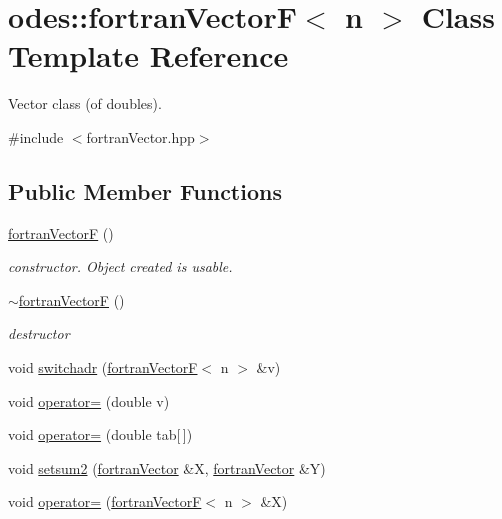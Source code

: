 \hypertarget{classodes_1_1fortranVectorF}{}\section{odes\+:\+:fortran\+Vector\+F$<$ n $>$ Class Template Reference}
\label{classodes_1_1fortranVectorF}


Vector class (of doubles).  




{\ttfamily \#include $<$fortran\+Vector.\+hpp$>$}

\subsection*{Public Member Functions}
\begin{DoxyCompactItemize}
\item 
\hyperlink{classodes_1_1fortranVectorF_a446528db3c1fe4b61dcfac9402b8c619}{fortran\+Vector\+F} ()
\begin{DoxyCompactList}\small\item\em constructor. Object created is usable. \end{DoxyCompactList}\item 
\hyperlink{classodes_1_1fortranVectorF_a668d0dbea090a6298c165092b27502ed}{$\sim$fortran\+Vector\+F} ()
\begin{DoxyCompactList}\small\item\em destructor \end{DoxyCompactList}\item 
void \hyperlink{classodes_1_1fortranVectorF_a88c726b6b22cdf20f81b345c89a51b95}{switchadr} (\hyperlink{classodes_1_1fortranVectorF}{fortran\+Vector\+F}$<$ n $>$ \&v)
\item 
void \hyperlink{classodes_1_1fortranVectorF_afeffa2b15976ed45e30a02af9afd1b58}{operator=} (double v)
\item 
void \hyperlink{classodes_1_1fortranVectorF_ae03bfc204b53e79814d762d43ee569fa}{operator=} (double tab\mbox{[}$\,$\mbox{]})
\item 
void \hyperlink{classodes_1_1fortranVectorF_a378e1167cdb871723f9a0ce254671a97}{setsum2} (\hyperlink{classodes_1_1fortranVector}{fortran\+Vector} \&X, \hyperlink{classodes_1_1fortranVector}{fortran\+Vector} \&Y)
\item 
void \hyperlink{classodes_1_1fortranVectorF_a222a619a78c85e3f9b977e7dc0d140c3}{operator=} (\hyperlink{classodes_1_1fortranVectorF}{fortran\+Vector\+F}$<$ n $>$ \&X)

\end{DoxyCompactItemize}

